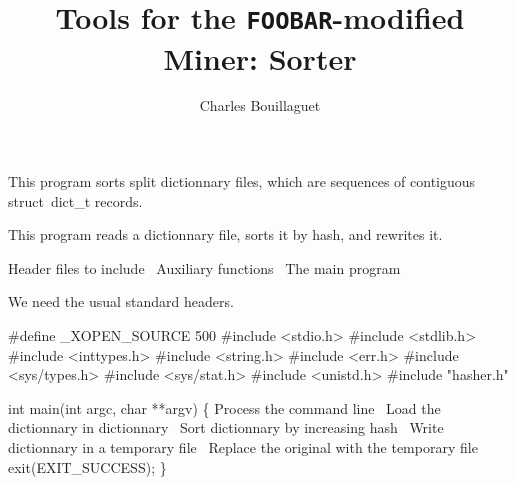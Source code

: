 \documentclass{article}%
\begin{document}
\title{Tools for the \texttt{FOOBAR}-modified Miner: Sorter}
\author{Charles Bouillaguet}

\maketitle

This program sorts split dictionnary files, which are sequences of contiguous {\Tt{}struct\ dict{\_}t\nwendquote} records.


This program reads a dictionnary file, sorts it by hash, and rewrites it.

\nwenddocs{}\endmoddef\nwstartdeflinemarkup\nwenddeflinemarkup
\LA{}Header files to include~{\nwtagstyle{}}\RA{}
\LA{}Auxiliary functions~{\nwtagstyle{}}\RA{}
\LA{}The main program~{\nwtagstyle{}}\RA{}

\nwnotused{*}\nwendcode{}We need the usual standard headers.

\nwenddocs{}\endmoddef\nwstartdeflinemarkup{}\nwenddeflinemarkup
#define _XOPEN_SOURCE 500
#include <stdio.h>
#include <stdlib.h>
#include <inttypes.h>
#include <string.h>
#include <err.h>
#include <sys/types.h>
#include <sys/stat.h>
#include <unistd.h>
#include "hasher.h"

\nwendcode{}\endmoddef\nwstartdeflinemarkup{}\nwenddeflinemarkup
int main(int argc, char **argv)
\{
        \LA{}Process the command line~{\nwtagstyle{}}\RA{}
        \LA{}Load the dictionnary in \code{}dictionnary\edoc{}~{\nwtagstyle{}}\RA{}
        \LA{}Sort \code{}dictionnary\edoc{} by increasing hash~{\nwtagstyle{}}\RA{}
        \LA{}Write \code{}dictionnary\edoc{} in a temporary file~{\nwtagstyle{}}\RA{}
        \LA{}Replace the original with the temporary file~{\nwtagstyle{}}\RA{}
        exit(EXIT_SUCCESS);
\}
\end{document}

